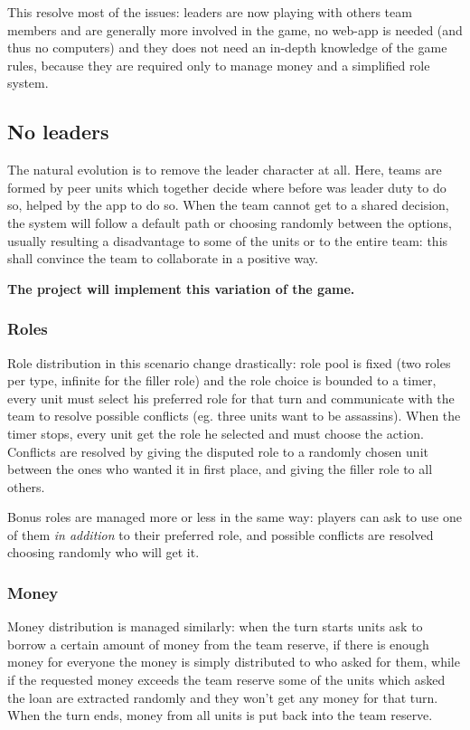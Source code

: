 			This resolve most of the issues: leaders are now playing with others team members and are generally more involved in the game, no web-app is needed (and thus no computers) and they does not need an in-depth knowledge of the game rules, because they are required only to manage money and a simplified role system.
		
		\subsection{No leaders}
		
			The natural evolution is to remove the leader character at all.
			Here, teams are formed by peer units which together decide where before was leader duty to do so, helped by the app to do so.
			When the team cannot get to a shared decision, the system will follow a default path or choosing randomly between the options, usually resulting a disadvantage to some of the units or to the entire team: this shall convince the team to collaborate in a positive way.
			
			\textbf{The project will implement this variation of the game.}
			
			\subsubsection{Roles}
			\label{nolead:role}
				Role distribution in this scenario change drastically: role pool is fixed (two roles per type, infinite for the filler role) and the role choice is bounded to a timer, every unit must select his preferred role for that turn and communicate with the team to resolve possible conflicts (eg. three units want to be assassins).
				When the timer stops, every unit get the role he selected and must choose the action. Conflicts are resolved by giving the disputed role to a randomly chosen unit between the ones who wanted it in first place, and giving the filler role to all others.
				
				Bonus roles are managed more or less in the same way: players can ask to use one of them \emph{in addition} to their preferred role, and possible conflicts are resolved choosing randomly who will get it.
							
			\subsubsection{Money}
				Money distribution is managed similarly: when the turn starts units ask to borrow a certain amount of money from the team reserve, if there is enough money for everyone the money is simply distributed to who asked for them, while if the requested money exceeds the team reserve some of the units which asked the loan are extracted randomly and they won't get any money for that turn.
				When the turn ends, money from all units is put back into the team reserve.
				
